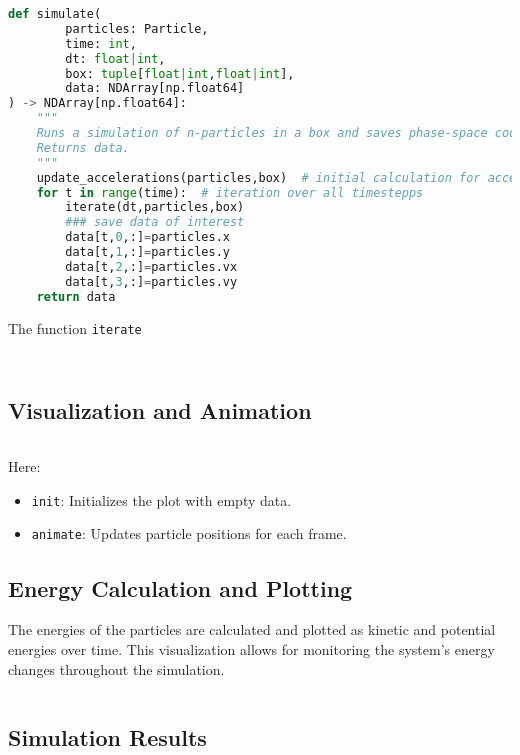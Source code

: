 \documentclass{article}
\begin{document}
\begin{lstlisting}[language=Python, caption=Simulation]
def simulate(
        particles: Particle, 
        time: int,
        dt: float|int, 
        box: tuple[float|int,float|int],
        data: NDArray[np.float64]
) -> NDArray[np.float64]:
    """
    Runs a simulation of n-particles in a box and saves phase-space coordinates to data.\n
    Returns data.
    """
    update_accelerations(particles,box)  # initial calculation for accelerations
    for t in range(time):  # iteration over all timestepps
        iterate(dt,particles,box)
        ### save data of interest
        data[t,0,:]=particles.x
        data[t,1,:]=particles.y
        data[t,2,:]=particles.vx
        data[t,3,:]=particles.vy
    return data
\end{lstlisting}

The function \texttt{iterate} 

\begin{lstlisting}[language=python, caption={Iterates the positions by Velocity Verlet}]
    
\end{lstlisting}

\subsection{Visualization and Animation}

\begin{lstlisting}[language=Python, caption=Animation Setup]


\end{lstlisting}


\noindent
Here:
\begin{itemize}
    \item \texttt{init}: Initializes the plot with empty data.
    \item \texttt{animate}: Updates particle positions for each frame.
\end{itemize}

\subsection{Energy Calculation and Plotting}

The energies of the particles are calculated and plotted as kinetic and potential energies over time. This visualization allows for monitoring the system’s energy changes throughout the simulation.

\begin{lstlisting}[language=Python, caption=Energy Plotting]

\end{lstlisting}

\noindent



\subsection{Simulation Results}
\end{document}
